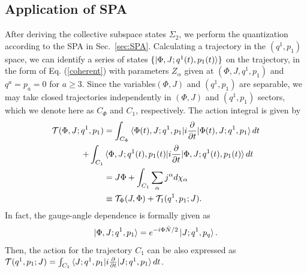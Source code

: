 \documentclass[%
superscriptaddress,
showpacs,
nofootinbib,
amsmath,amssymb,
aps,
prc,
twocolumn,
floatfix ]%
{revtex4-1}
\begin{document}


\subsection{Application of SPA}

After deriving the collective subspace states $\Sigma_2$, 
we perform the quantization according to the SPA in Sec.~\ref{sec:SPA}.
Calculating a trajectory in the $(q^1,p_1)$ space,
we can identify a series of states $\{\ket{\Phi,J;q^1(t),p_1(t)}\}$
on the trajectory,
in the form of Eq. (\ref{coherent})
with parameters $Z_\alpha$ given at $(\Phi,J,q^1,p_1)$ and $q^a=p_a=0$ for
$a\geq 3$.
Since the variables$(\Phi,J)$ and $(q^1,p_1)$ are separable,
we may take closed trajectories independently in $(\Phi,J)$ and $(q^1,p_1)$
sectors, which we denote here as $C_\Phi$ and $C_1$, respectively.
The action integral is given by
\begin{align}
\mathcal{T}(\Phi,J;q^1,p_1)
&= \int_{C_\Phi} \braket{\Phi(t),J;q^1,p_1|i\frac{\partial}{\partial t}|\Phi(t),J;q^1,p_1} dt \nonumber \\
+ \int_{C_1} &\braket{\Phi,J;q^1(t),p_1(t)|i\frac{\partial}{\partial t}|\Phi,J;q^1(t),p_1(t)} dt
 \nonumber \\
	&=J\Phi + \int_{C_1} \sum_\alpha j^\alpha d\chi_\alpha
	\nonumber \\
	&\equiv \mathcal{T}_\Phi(J,\Phi) +\mathcal{T}_1(q^1,p_1;J) .
	\label{tau}
\end{align}
In fact, the gauge-angle dependence is formally given as
\begin{equation}
\ket{\Phi,J;q^1,p_1} = e^{-i\Phi \hat{N}/2} \ket{J;q^1,p_q} .
\end{equation}
Then, the action for the trajectory $C_1$ can be also expressed as
$\mathcal{T}(q^1,p_1;J)=
 \int_{C_1} \braket{J;q^1,p_1|i\frac{\partial}{\partial t}|J;q^1,p_1} dt$.
\end{document}
